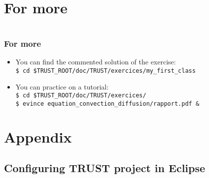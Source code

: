 \documentclass[10pt, hyperref={unicode=true,pdfusetitle, bookmarks=true,bookmarksnumbered=false,bookmarksopen=false, breaklinks=false,pdfborder={0 0 1},backref=true,colorlinks=true,linkcolor=darkblue,pageanchor, urlcolor=darkblue}]{beamer}
\begin{document}
\section{{\bf{For more}}}
\begin{frame}
\begin{columns}[c] 
\tableofcontents[sections={1-4},currentsection, currentsubsection]
\tableofcontents[sections={5-10},currentsection, currentsubsection]
\end{columns}
\end{frame}
\begin{frame}
\frametitle{For more}
\begin{block}{}

\begin{itemize}
\item You can find the commented solution of the exercise:\\
\texttt{\$ cd \$TRUST\_ROOT/doc/TRUST/exercices/my\_first\_class}

\item You can practice on a tutorial:\\
\texttt{\$ cd \$TRUST\_ROOT/doc/TRUST/exercices/}\\
\texttt{\$ evince equation\_convection\_diffusion/rapport.pdf \&}
\end{itemize}

\end{block}
\end{frame}

\section{\bf{Appendix}}
\subsection{\bf{Configuring TRUST project in Eclipse}}
\end{document}
